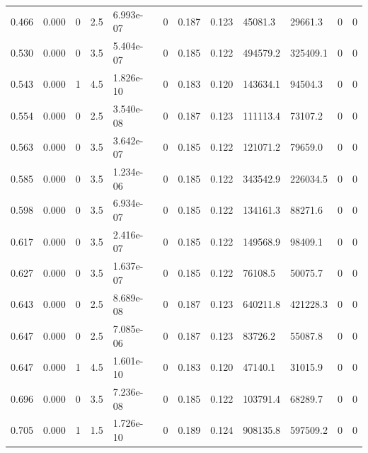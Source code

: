 \documentclass[preview]{standalone}
\begin{document}
{{\begin{tabular}{L{1.2cm}C{1.2cm} C{0.3cm}C{0.5cm} C{1.4cm}C{1.4cm} C{1.4cm}C{1.4cm} C{1.6cm}C{1.6cm} C{1.6cm}C{1.6cm}}
  0.466  &  0.000  & 0     & 2.5 &  6.993e-07  & 0  &  0.187&   0.123& 45081.3 & 29661.3   &  0 & 0  \\ 
  0.530  &  0.000  & 0     & 3.5 &  5.404e-07  & 0  &  0.185&   0.122& 494579.2 & 325409.1   &  0 & 0  \\ 
  0.543  &  0.000  & 1     & 4.5 &  1.826e-10  & 0  &  0.183&   0.120& 143634.1 & 94504.3   &  0 & 0  \\ 
  0.554  &  0.000  & 0     & 2.5 &  3.540e-08  & 0  &  0.187&   0.123& 111113.4 & 73107.2   &  0 & 0  \\ 
  0.563  &  0.000  & 0     & 3.5 &  3.642e-07  & 0  &  0.185&   0.122& 121071.2 & 79659.0   &  0 & 0  \\ 
  0.585  &  0.000  & 0     & 3.5 &  1.234e-06  & 0  &  0.185&   0.122& 343542.9 & 226034.5   &  0 & 0  \\ 
  0.598  &  0.000  & 0     & 3.5 &  6.934e-07  & 0  &  0.185&   0.122& 134161.3 & 88271.6   &  0 & 0  \\ 
  0.617  &  0.000  & 0     & 3.5 &  2.416e-07  & 0  &  0.185&   0.122& 149568.9 & 98409.1   &  0 & 0  \\ 
  0.627  &  0.000  & 0     & 3.5 &  1.637e-07  & 0  &  0.185&   0.122& 76108.5 & 50075.7   &  0 & 0  \\ 
  0.643  &  0.000  & 0     & 2.5 &  8.689e-08  & 0  &  0.187&   0.123& 640211.8 & 421228.3   &  0 & 0  \\ 
  0.647  &  0.000  & 0     & 2.5 &  7.085e-06  & 0  &  0.187&   0.123& 83726.2 & 55087.8   &  0 & 0  \\ 
  0.647  &  0.000  & 1     & 4.5 &  1.601e-10  & 0  &  0.183&   0.120& 47140.1 & 31015.9   &  0 & 0  \\ 
  0.696  &  0.000  & 0     & 3.5 &  7.236e-08  & 0  &  0.185&   0.122& 103791.4 & 68289.7   &  0 & 0  \\ 
  0.705  &  0.000  & 1     & 1.5 &  1.726e-10  & 0  &  0.189&   0.124& 908135.8 & 597509.2   &  0 & 0  \\ 
\hline 
\end{tabular} 

}}
\end{document}
